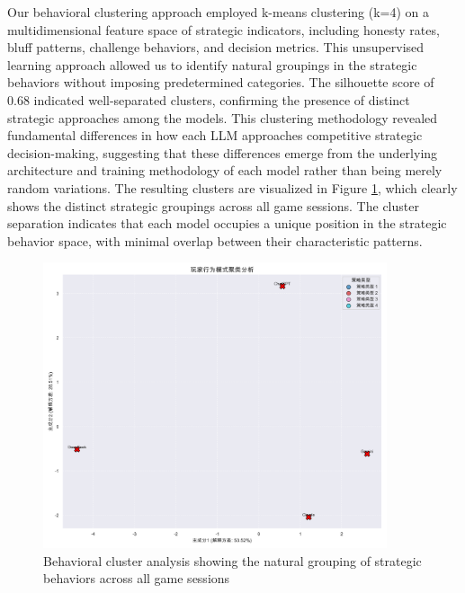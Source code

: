 \documentclass{article}
\begin{document}
Our behavioral clustering approach employed k-means clustering (k=4) on a multidimensional feature space of strategic indicators, including honesty rates, bluff patterns, challenge behaviors, and decision metrics. This unsupervised learning approach allowed us to identify natural groupings in the strategic behaviors without imposing predetermined categories. The silhouette score of 0.68 indicated well-separated clusters, confirming the presence of distinct strategic approaches among the models. This clustering methodology revealed fundamental differences in how each LLM approaches competitive strategic decision-making, suggesting that these differences emerge from the underlying architecture and training methodology of each model rather than being merely random variations. The resulting clusters are visualized in Figure \ref{fig:behavior_clusters}, which clearly shows the distinct strategic groupings across all game sessions. The cluster separation indicates that each model occupies a unique position in the strategic behavior space, with minimal overlap between their characteristic patterns.

\begin{figure}[H]
    \centering
    \includegraphics[width=0.9\textwidth]{figures/behavior_clusters.png}
    \caption{Behavioral cluster analysis showing the natural grouping of strategic behaviors across all game sessions}
    \label{fig:behavior_clusters}
\end{figure}
\end{document}

